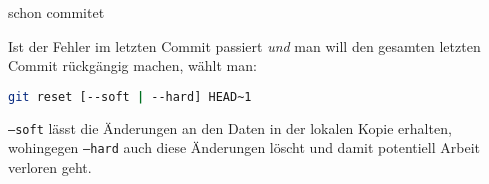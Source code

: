 \documentclass{abgabe}
\begin{document}
\begin{questions}
\begin{parts}
\begin{subparts}
            \subpart 
            schon commitet
            \begin{solution}
                Ist der Fehler im letzten Commit passiert \emph{und} man will den gesamten letzten Commit rückgängig machen, wählt man: 
                \begin{lstlisting}[language=bash, basicstyle=\ttfamily]
                git reset [--soft | --hard] HEAD~1
                \end{lstlisting}
                
                \texttt{--soft} lässt die Änderungen an den Daten in der lokalen Kopie erhalten, wohingegen \texttt{--hard} auch diese Änderungen löscht und damit potentiell Arbeit verloren geht.
            \end{solution}
        \end{subparts}
    \end{parts}
\end{questions}
\end{document}
